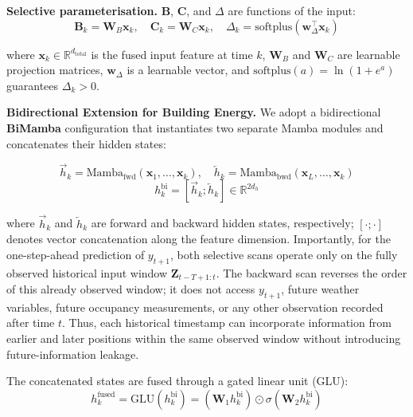 \documentclass[11pt]{article}
\begin{document}
\textbf{Selective parameterisation.} $\mathbf{B}$, $\mathbf{C}$, and $\Delta$ are functions of the input:
\begin{equation}
\mathbf{B}_k = \mathbf{W}_B \mathbf{x}_k, \quad \mathbf{C}_k = \mathbf{W}_C \mathbf{x}_k, \quad \Delta_k = \text{softplus}(\mathbf{w}_\Delta^\top \mathbf{x}_k)
\end{equation}

where $\mathbf{x}_k \in \mathbb{R}^{d_{\text{total}}}$ is the fused input feature at time $k$, $\mathbf{W}_B$ and $\mathbf{W}_C$ are learnable projection matrices, $\mathbf{w}_\Delta$ is a learnable vector, and $\text{softplus}(a)=\ln(1+e^a)$ guarantees $\Delta_k>0$.

\medskip
\par\noindent\hspace*{2em}\textbf{Bidirectional Extension for Building Energy.} We adopt a bidirectional \textbf{BiMamba} configuration that instantiates two separate Mamba modules and concatenates their hidden states:

\begin{equation}
\vec{h}_k = \text{Mamba}_{\text{fwd}}(\mathbf{x}_1, \ldots, \mathbf{x}_k), \quad \overleftarrow{h}_k = \text{Mamba}_{\text{bwd}}(\mathbf{x}_L, \ldots, \mathbf{x}_k)
\end{equation}
\begin{equation}
h_k^{\text{bi}} = [\vec{h}_k; \overleftarrow{h}_k] \in \mathbb{R}^{2d_h}
\end{equation}

where $\vec{h}_k$ and $\overleftarrow{h}_k$ are forward and backward hidden states, respectively; $[\cdot;\cdot]$ denotes vector concatenation along the feature dimension. Importantly, for the one-step-ahead prediction of $y_{t+1}$, both selective scans operate only on the fully observed historical input window $\mathbf{Z}_{t-T+1:t}$. The backward scan reverses the order of this already observed window; it does not access $y_{t+1}$, future weather variables, future occupancy measurements, or any other observation recorded after time $t$. Thus, each historical timestamp can incorporate information from earlier and later positions within the same observed window without introducing future-information leakage.

The concatenated states are fused through a gated linear unit (GLU):
\begin{equation}
h_k^{\text{fused}} = \text{GLU}(h_k^{\text{bi}}) = (\mathbf{W}_1 h_k^{\text{bi}}) \odot \sigma(\mathbf{W}_2 h_k^{\text{bi}})
\end{equation}
\end{document}
